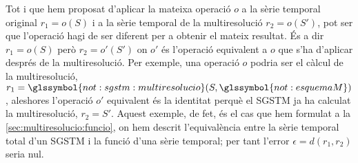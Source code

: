 Tot i que hem proposat d'aplicar la mateixa operació $o$ a la sèrie
temporal original $r_1=o(S)$ i a la sèrie temporal de la
multiresolució $r_2=o(S')$, pot ser que l'operació hagi de ser
diferent per a obtenir el mateix resultat. És a dir $r_1=o(S)$ però
$r_2=o'(S')$ on $o'$ és l'operació equivalent a $o$ que s'ha d'aplicar
després de la multiresolució.  Per exemple, una operació $o$ podria
ser el càlcul de la multiresolució,
$r_1=\glssymbol{not:sgstm:multiresolucio}(S,\glssymbol{not:esquemaM})$,
aleshores l'operació $o'$ equivalent és la identitat perquè el
\gls{SGSTM} ja ha calculat la multiresolució, $r_2=S'$. Aquest
exemple, de fet, és el cas que hem formulat a la
\autoref{sec:multiresolucio:funcio}, on hem descrit l'equivalència
entre la sèrie temporal total d'un \gls{SGSTM} i la funció
 d'una sèrie temporal; per tant
l'error $\epsilon =d(r_1,r_2)$ seria nul.



